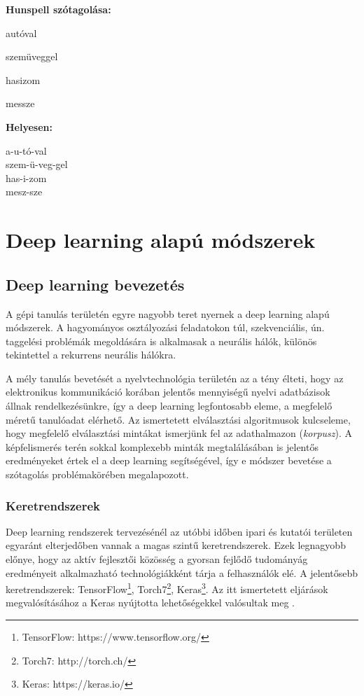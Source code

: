\documentclass[a4paper, magyar]{article}
\begin{document}
\begin{minipage}{0.4\textwidth}
	\textbf{Hunspell szótagolása:}
\begin{checkhyphens}
	autóval
	
	szemüveggel
	
	hasizom
	
	messze
\end{checkhyphens} 		
\end{minipage}\hfill
\begin{minipage}{0.4\textwidth}
	\textbf{Helyesen:}

	a-u-tó-val\\
	szem-ü-veg-gel\\
	has-i-zom\\
	mesz-sze
\end{minipage}

\section{Deep learning alapú módszerek}
\subsection{Deep learning bevezetés}
A gépi tanulás területén egyre nagyobb teret nyernek a deep learning alapú módszerek. A hagyományos osztályozási feladatokon túl, szekvenciális, ún. taggelési problémák megoldására is alkalmasak a neurális hálók, különös tekintettel a rekurrens neurális hálókra.

A mély tanulás bevetését a nyelvtechnológia területén az a tény élteti, hogy az elektronikus kommunikáció korában jelentős mennyiségű nyelvi adatbázisok állnak rendelkezésünkre, így a deep learning legfontosabb eleme, a megfelelő méretű tanulóadat elérhető. Az ismertetett elválasztási algoritmusok kulcseleme, hogy megfelelő elválasztási mintákat ismerjünk fel az adathalmazon (\textit{korpusz}). A képfelismerés terén sokkal komplexebb minták megtalálásában is jelentős eredményeket értek el a deep learning segítségével, így e módszer bevetése a szótagolás problémakörében megalapozott.

\subsubsection{Keretrendszerek}
Deep learning rendszerek tervezésénél az utóbbi időben ipari és kutatói területen egyaránt elterjedőben vannak a magas szintű keretrendszerek. Ezek legnagyobb előnye, hogy az aktív fejlesztői közösség a gyorsan fejlődő tudományág eredményeit alkalmazható technológiákként tárja a felhasználók elé. A jelentősebb keretrendszerek: TensorFlow\footnote{TensorFlow: https://www.tensorflow.org/}, Torch7\footnote{Torch7: http://torch.ch/}, Keras\footnote{Keras: https://keras.io/}. Az itt ismertetett eljárások megvalósításához a Keras nyújtotta lehetőségekkel valósultak meg \cite{chollet2015keras}.
\end{document}
